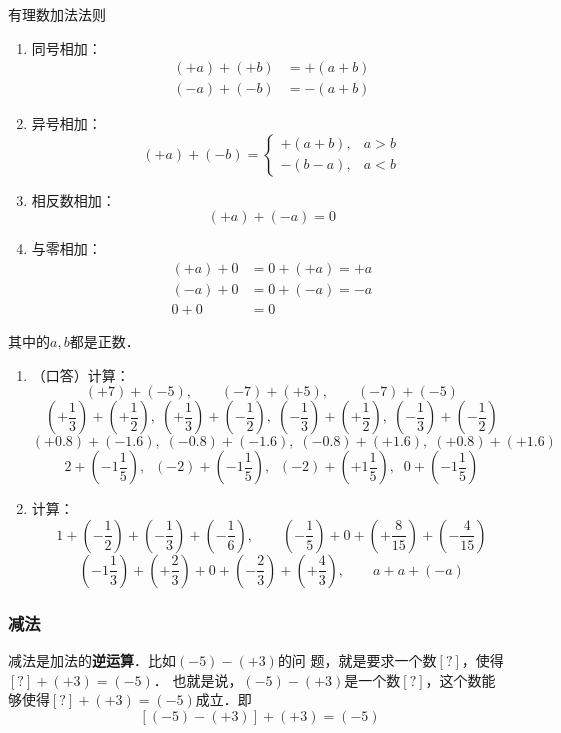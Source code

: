 \begin{blk}{有理数加法法则}
	\begin{enumerate}
		\item 同号相加：
		\[\begin{split}
		(+a)+(+b)&=+(a+b)\\
		(-a)+(-b)&=-(a+b)
		\end{split}\]
		\item 异号相加：
		\[(+a)+(-b)=\begin{cases}
		+(a+b),& a>b\\
		-(b-a),&a<b
		\end{cases}\]
		\item 相反数相加：
		\[(+a)+(-a)=0\]
		\item 与零相加：
		\[\begin{split}
		(+a)+0&=0+(+a)=+a\\
		(-a)+0&=0+(-a)=-a\\
		0+0&=0
		\end{split}\]
	\end{enumerate}    
	其中的$a,b$都是正数．
\end{blk}

\begin{ex}
	\begin{enumerate}
		\item （口答）计算：
		\[(+7)+(-5),\qquad (-7)+(+5),\qquad (-7)+(-5) \]
		\[\left(+\frac{1}{3}\right)+\left(+\frac{1}{2}\right),\; \left(+\frac{1}{3}\right)+\left(-\frac{1}{2}\right),\; \left(-\frac{1}{3}\right)+\left(+\frac{1}{2}\right) ,\; \left(-\frac{1}{3}\right)+\left(-\frac{1}{2}\right) \]
		\[(+0.8)+(-1.6),\; (-0.8)+(-1.6),\; (-0.8)+(+1.6),\; (+0.8)+(+1.6) \]
		\[2+\left(-1\frac{1}{5}\right),\;\;(-2)+\left(-1\frac{1}{5}\right),\;\;(-2)+\left(+1\frac{1}{5}\right),\;\; 0+\left(-1\frac{1}{5}\right)\]
		\item 计算：
		\[1+\left(-\frac{1}{2}\right)+\left(-\frac{1}{3}\right)+\left(-\frac{1}{6}\right),\qquad \left(-\frac{1}{5}\right)+0+\left(+\frac{8}{15}\right)+\left(-\frac{4}{15}\right) \]
		\[\left(-1\frac{1}{3}\right)+\left(+\frac{2}{3}\right)+0+\left(-\frac{2}{3}\right)+\left(+\frac{4}{3}\right),\qquad a+a+(-a) \]
	\end{enumerate}
\end{ex}

\subsubsection{减法}

减法是加法的\textbf{逆运算}．比如$(-5)-(+3)$的问
题，就是要求一个数$[?]$，使得$[?]+(+3)=(-5)$．
也就是说，$(-5)-(+ 3)$是一个数$[?]$，这个数能
够使得$[?]+(+3)=(-5)$成立．即
$$[(-5)-(+3) ]+(+3)=(-5)$$

